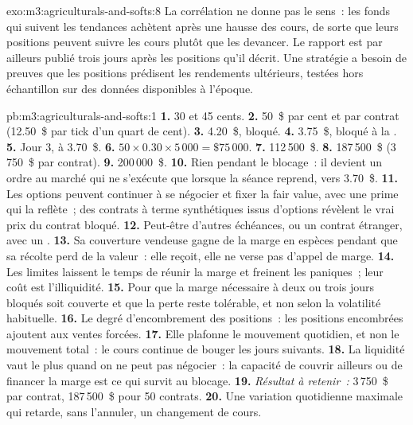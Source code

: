 \begin{solution}{exo:m3:agriculturals-and-softs:8}
La corrélation ne donne pas le sens~: les fonds qui suivent les tendances achètent après une hausse des cours, de sorte que leurs
positions peuvent suivre les cours plutôt que les devancer. Le rapport est par ailleurs publié trois jours après les positions
qu'il décrit. Une stratégie a besoin de preuves que les positions prédisent les rendements ultérieurs, testées hors échantillon sur des données
disponibles à l'époque.
\end{solution}

\begin{solution}{pb:m3:agriculturals-and-softs:1}
\textbf{1.} 30 et 45 cents. \textbf{2.} 50~\$ par cent et par contrat (12.50~\$ par tick d'un quart de cent).
\textbf{3.} 4.20~\$, bloqué. \textbf{4.} 3.75~\$, bloqué à la . \textbf{5.} Jour 3, à 3.70~\$.
\textbf{6.} $50 \times 0.30 \times 5\,000 = \$75\,000$. \textbf{7.} 112\,500~\$. \textbf{8.} 187\,500~\$
(3\,750~\$ par contrat). \textbf{9.} 200\,000~\$. \textbf{10.} Rien pendant le blocage~: il devient un
ordre au marché qui ne s'exécute que lorsque la séance reprend, vers 3.70~\$. \textbf{11.} Les options peuvent continuer à se négocier et
fixer la fair value, avec une prime qui la reflète~; des contrats à terme synthétiques issus d'options révèlent le
vrai prix du contrat bloqué. \textbf{12.} Peut-être d'autres échéances, ou un contrat étranger, avec un .
\textbf{13.} Sa couverture vendeuse gagne de la marge en espèces pendant que sa récolte perd de la valeur~: elle reçoit, elle ne verse pas d'appel de marge.
\textbf{14.} Les limites laissent le temps de réunir la marge et freinent les paniques~; leur coût est l'illiquidité. \textbf{15.} Pour que
la marge nécessaire à deux ou trois jours bloqués soit couverte et que la perte reste tolérable, et non selon la volatilité habituelle.
\textbf{16.} Le degré d'encombrement des positions~: les positions encombrées ajoutent aux ventes forcées. \textbf{17.} Elle plafonne le
mouvement quotidien, et non le mouvement total~: le cours continue de bouger les jours suivants. \textbf{18.} La liquidité vaut le plus
quand on ne peut pas négocier~: la capacité de couvrir ailleurs ou de financer la marge est ce qui survit au blocage.
\textbf{19.} \emph{Résultat à retenir~:} 3\,750~\$ par contrat, 187\,500~\$ pour 50 contrats. \textbf{20.} Une
variation quotidienne maximale qui retarde, sans l'annuler, un changement de cours.
\end{solution}

